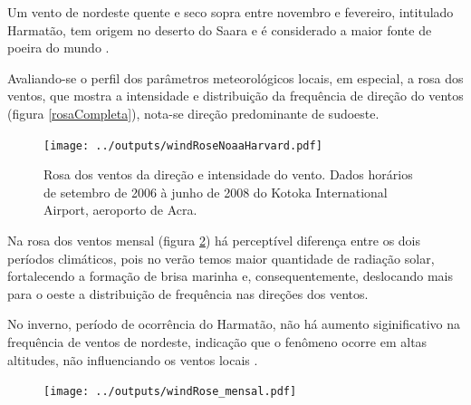 Um vento de nordeste quente e seco sopra entre novembro e fevereiro,
intitulado Harmatão, tem origem no deserto do Saara e é considerado 
a maior fonte de poeira do mundo \citep{breuning2005}.


Avaliando-se o perfil dos parâmetros meteorológicos locais, em especial, 
a rosa dos ventos, que mostra a intensidade e distribuição da frequência de 
direção do ventos (figura \ref{rosaCompleta}),
nota-se direção predominante de sudoeste. 

\begin{figure}[H]
  \centering
  \texttt{[image: ../outputs/windRoseNoaaHarvard.pdf]}
  \caption{Rosa dos ventos da direção e intensidade do vento. 
           Dados horários de setembro de 2006 à junho de 2008 do 
           Kotoka International Airport, aeroporto de Acra. 
           \label{fg:rosaCompleta}}
\end{figure}

Na rosa dos ventos mensal (figura \ref{fig:windRose_mensal})
há perceptível diferença entre os dois períodos climáticos, 
pois no verão temos maior quantidade de radiação solar, fortalecendo a 
formação de brisa marinha e, consequentemente, deslocando mais para o 
oeste a distribuição de frequência nas direções dos ventos.

No inverno, período de ocorrência do Harmatão, não há aumento siginificativo 
na frequência de ventos de nordeste, indicação que o fenômeno ocorre em 
altas altitudes, não influenciando os ventos locais \citep{breuning2005}. 

\begin{figure}[H]
  \centering
  \texttt{[image: ../outputs/windRose\_mensal.pdf]}
  \caption{ \citep{carslaw2012} \label{fig:windRose_mensal}}
\end{figure}



